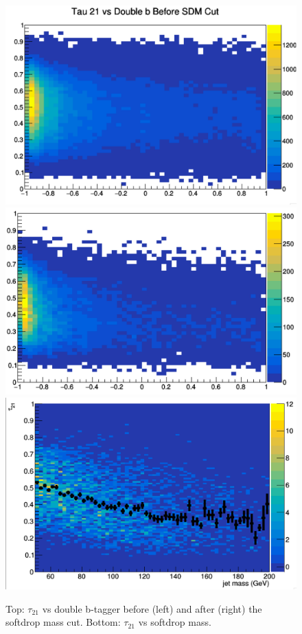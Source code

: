 \begin{figure}[thb!]
\begin{center}
\includegraphics[scale=0.35]{Figures/tau21vdoublebBeforeMassCut.pdf}
\includegraphics[scale=0.35]{Figures/tau21vdoublebAfterMassCut.pdf}\\
\includegraphics[scale=0.35]{Figures/tau21jetmass2D.pdf}
\end{center}
\caption{Top: $\tau_{21}$ vs double b-tagger before (left) and after (right) the softdrop mass cut. Bottom: $\tau_{21}$ vs softdrop mass.}
\label{fig:tauDBSD}
\end{figure}

